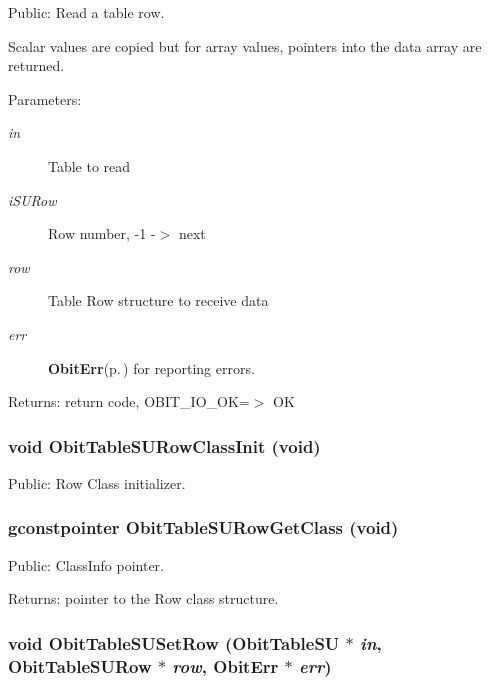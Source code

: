 Public: Read a table row. 

Scalar values are copied but for array values, pointers into the data array are returned. \begin{Desc}
\item[Parameters:]
\begin{description}
\item[{\em in}]Table to read \item[{\em i\-SURow}]Row number, -1 -$>$ next \item[{\em row}]Table Row structure to receive data \item[{\em err}]{\bf Obit\-Err}{\rm (p.\,\pageref{structObitErr})} for reporting errors. \end{description}
\end{Desc}
\begin{Desc}
\item[Returns:]return code, OBIT\_\-IO\_\-OK=$>$ OK \end{Desc}
\subsubsection{\setlength{\rightskip}{0pt plus 5cm}void Obit\-Table\-SURow\-Class\-Init (void)}\label{ObitTableSU_8h_a7}


Public: Row Class initializer. 

\subsubsection{\setlength{\rightskip}{0pt plus 5cm}gconstpointer Obit\-Table\-SURow\-Get\-Class (void)}\label{ObitTableSU_8h_a9}


Public: Class\-Info pointer. 

\begin{Desc}
\item[Returns:]pointer to the Row class structure. \end{Desc}
\subsubsection{\setlength{\rightskip}{0pt plus 5cm}void Obit\-Table\-SUSet\-Row ({\bf Obit\-Table\-SU} $\ast$ {\em in}, {\bf Obit\-Table\-SURow} $\ast$ {\em row}, {\bf Obit\-Err} $\ast$ {\em err})}\label{ObitTableSU_8h_a19}


